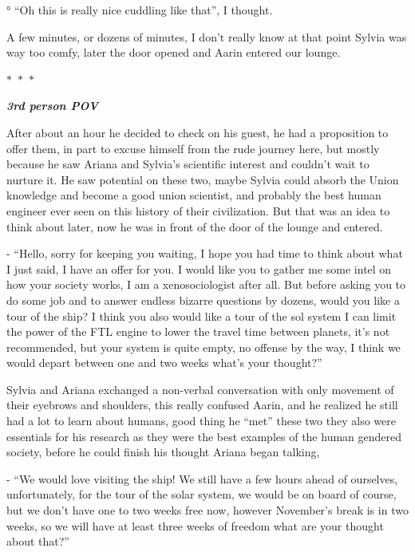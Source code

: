\documentclass[hidelinks,12pt,a4paper]{book}
\newcommand\sep{\begin{center}
  \boldmath $\ast$~$\ast$~$\ast$
\end{center}}
\begin{document}
° “Oh this is really nice cuddling like that”, I thought.\par
\bigskip

A few minutes, or dozens of minutes, I don't really know at that point Sylvia was way too comfy, later the door opened 
and Aarin entered our lounge.

\sep

\textit{\textbf{3rd person POV}}\par
\bigskip

After about an hour he decided to check on his guest, he had a proposition to offer them, 
in part to excuse himself from the rude journey here, but mostly because he saw Ariana and Sylvia's 
scientific interest and couldn't wait to nurture it. He saw potential on these two, maybe Sylvia could absorb the 
Union knowledge and become a good union scientist, and probably the best human engineer ever seen on this history 
of their civilization. But that was an idea to think about later, now he was in front of the door of the lounge and entered.\par
\bigskip

- “Hello, sorry for keeping you waiting, I hope you had time to think about what I just said,
 I have an offer for you. I would like you to gather me some intel on how your society works, I am a xenosociologist
  after all. But before asking you to do some job and to answer endless bizarre questions by dozens, would you like 
  a tour of the ship? I think you also would like a tour of the sol system I can limit the power of the FTL engine 
  to lower the travel time between planets, it's not recommended, but your system is quite empty, no offense by the way, 
  I think we would depart between one and two weeks what's your thought?”\par
  \bigskip

Sylvia and Ariana exchanged a non-verbal conversation with only movement of their eyebrows and shoulders, this really 
confused Aarin, and he realized he still had a lot to learn about humans, good thing he “met” these two they also 
were essentials for his research as they were the best examples of the human gendered society, before he could 
finish his thought Ariana began talking,\par
\bigskip

- “We would love visiting the ship! We still have a few hours ahead of ourselves, unfortunately, for the tour of
 the solar system, we would be on board of course, but we don't have one to two weeks free now, however November's break
 is in two weeks, so we will have at least three weeks of freedom what are your thought about that?”\par
 \bigskip
\end{document}
